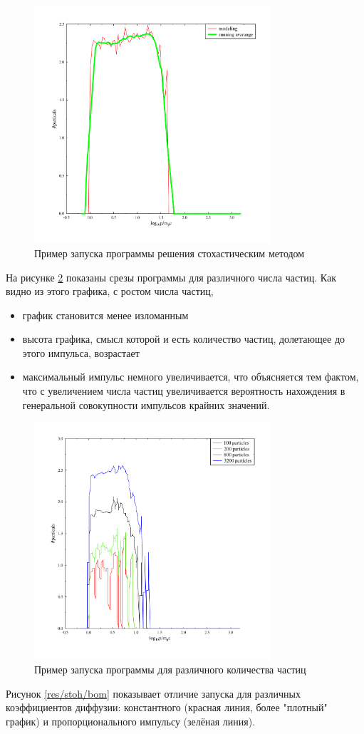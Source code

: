 \documentclass[a4paper,14pt]{extarticle} %
\begin{document}
\begin{figure}[!htb]
\centering
\includegraphics[width=250pt]{stoh_bom_one}
\caption{Пример запуска программы решения стохастическим методом}
\label{res/stoh/common}
\end{figure}
На рисунке \ref{res/stoh/particles} показаны срезы программы для различного числа частиц. Как видно из этого графика, с ростом числа частиц,
\begin{itemize}
\item график становится менее изломанным
\item высота графика, смысл которой и есть количество частиц, долетающее до этого импульса, возрастает
\item максимальный импульс немного увеличивается, что объясняется тем фактом, что с увеличением числа частиц увеличивается вероятность нахождения в генеральной совокупности импульсов крайних значений.
\end{itemize}
\begin{figure}[!htb]
\centering
\includegraphics[width=250pt]{stoh_particles}
\caption{Пример запуска программы для различного количества частиц}
\label{res/stoh/particles}
\end{figure}
Рисунок \ref{res/stoh/bom} показывает отличие запуска для различных коэффициентов диффузии: константного (красная линия, более "плотный" график) и пропорционального импульсу (зелёная линия). 
\end{document}
